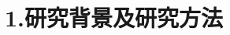\documentclass[9pt,t]{beamer} %
\begin{document}

\section{1.研究背景及研究方法}

\begin{frame}
\tableofcontents[currentsection] 
\end{frame}

\end{document}

